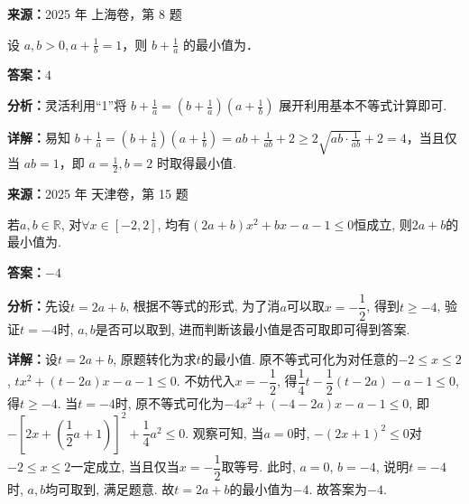 \begin{question}[points=5]
\textbf{来源：}2025 年 上海卷，第 8 题\par
设 $a, b > 0, a + \frac{1}{b} = 1$，则 $b + \frac{1}{a}$ 的最小值为．
\fillin[{$4$}]
\begin{solution}
\textbf{答案：}$4$

\textbf{分析：}灵活利用“1”将 $b + \frac{1}{a} = \left(b + \frac{1}{a}\right)\left(a + \frac{1}{b}\right)$ 展开利用基本不等式计算即可.

\textbf{详解：}易知 $b + \frac{1}{a} = \left(b + \frac{1}{a}\right)\left(a + \frac{1}{b}\right) = ab + \frac{1}{ab} + 2 \geq 2\sqrt{ab \cdot \frac{1}{ab}} + 2 = 4$，当且仅当 $ab = 1$，即 $a = \frac{1}{2}, b = 2$ 时取得最小值.
\end{solution}
\end{question}

\begin{question}[points=5]
\textbf{来源：}2025 年 天津卷，第 15 题\par
若$a, b \in \mathbb{R}$, 对$\forall x \in [-2, 2]$, 均有$(2a+b)x^2 + bx - a - 1 \le 0$恒成立, 则$2a+b$的最小值为.
\fillin[{$-4$}]
\begin{solution}
\textbf{答案：}$-4$

\textbf{分析：}先设$t = 2a + b$, 根据不等式的形式, 为了消$a$可以取$x = -\dfrac{1}{2}$, 得到$t \ge -4$, 验证$t = -4$时, $a, b$是否可以取到, 进而判断该最小值是否可取即可得到答案.

\textbf{详解：}设$t = 2a + b$, 原题转化为求$t$的最小值. 原不等式可化为对任意的$-2 \le x \le 2$, $tx^2 + (t - 2a)x - a - 1 \le 0$. 不妨代入$x = -\dfrac{1}{2}$, 得$\dfrac{1}{4}t - \dfrac{1}{2}(t - 2a) - a - 1 \le 0$, 得$t \ge -4$. 当$t = -4$时, 原不等式可化为$-4x^2 + (-4 - 2a)x - a - 1 \le 0$, 即$-\left[2x + \left(\dfrac{1}{2}a + 1\right)\right]^2 + \dfrac{1}{4}a^2 \le 0$. 观察可知, 当$a = 0$时, $-(2x+1)^2 \le 0$对$-2 \le x \le 2$一定成立, 当且仅当$x = -\dfrac{1}{2}$取等号. 此时, $a=0$, $b=-4$, 说明$t=-4$时, $a,b$均可取到, 满足题意. 故$t = 2a + b$的最小值为$-4$. 故答案为$-4$.
\end{solution}
\end{question}

